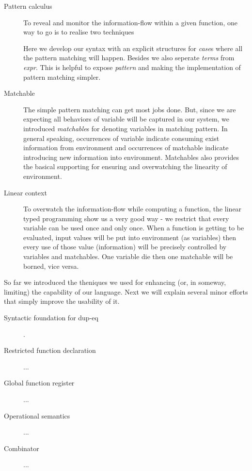 \documentclass[a4paper]{article}
\begin{document}
\begin{description}
\item[Pattern calculus] {
    To reveal and monitor the information-flow within a given function, one way to go is to realise two techniques
    Here we develop our syntax with an explicit structures for \textit{case}s where all the pattern matching will happen. Besides we also seperate \textit{terms} from \textit{expr}. This is helpful to expose \textit{pattern} and making the implementation of pattern matching simpler.
}
\item[Matchable] {
    The simple pattern matching can get most jobs done. But, since we are expecting all behaviors of variable will be captured in our system, we introduced \textit{matchable}s for denoting variables in matching pattern. In general speaking, occurrences of variable indicate consuming exist information from environment and occurrences of matchable indicate introducing new information into environment. Matchables also provides the basical supporting for ensuring and overwatching the linearity of environment.
}
\item[Linear context] {
    To overwatch the information-flow while computing a function, the linear typed programming show us a very good way - we restrict that every variable can be used once and only once. When a function is getting to be evaluated, input values will be put into environment (as variables) then every use of those value (information) will be precisely controlled by variables and matchables. One variable die then one matchable will be borned, vice versa.
}
\end{description}

So far we introduced the theniques we used for enhancing (or, in someway, limiting) the capability of our language. Next we will explain several minor efforts that simply improve the usability of it.

\begin{description}
\item[Syntactic foundation for dup-eq] .

\item[Restricted function declaration] ...
\item[Global function register] ...
\item[Operational semantics] ...
\item[Combinator] ...
\end{description}
\end{document}
